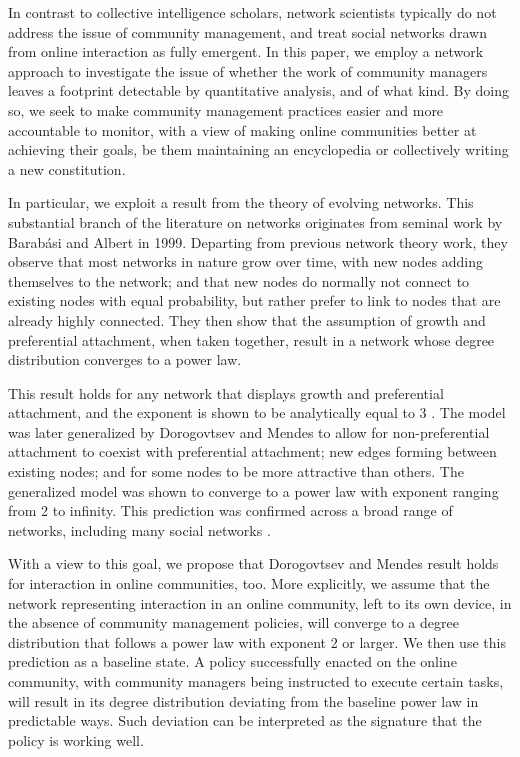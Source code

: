 \documentclass{nws}
\begin{document}
In contrast to collective intelligence scholars, network scientists typically do not address the issue of community management, and treat social networks drawn from online interaction as fully emergent. In this paper, we employ a network approach to investigate the issue of whether the work of community managers leaves a footprint detectable by quantitative analysis, and of what kind. By doing so, we seek to make community management practices easier and more accountable to monitor, with a view of making online communities better at achieving their goals, be them maintaining an encyclopedia or collectively writing a new constitution. 

In particular, we exploit a result from the theory of evolving networks. This substantial branch of the literature on networks originates from seminal work by Barab\'asi and Albert \cite{barabasi1999emergence} in 1999. Departing from previous network theory work, they observe that most networks in nature grow over time, with new nodes adding themselves to the network; and that new nodes do normally not connect to existing nodes with equal probability, but rather prefer to link to nodes that are already highly connected. They then show that the assumption of growth and preferential attachment, when taken together, result in a network whose degree distribution converges to a power law.

This result holds for any network that displays growth and preferential attachment, and the exponent is shown to be analytically equal to 3 \cite{barabasi2005origin, barabasi1999mean}.  The model was later generalized by Dorogovtsev and Mendes to allow for non-preferential attachment to coexist with preferential attachment; new edges forming between existing nodes; and for some nodes to be more attractive than others. The generalized model was shown to converge to a power law with exponent ranging from 2 to infinity. This prediction was confirmed across a broad range of networks, including many social networks \cite{dorogovtsev2002evolution}.

With a view to this goal, we propose that Dorogovtsev and Mendes result \cite{dorogovtsev2002evolution} holds for interaction in online communities, too. More explicitly, we assume that the network representing interaction in an online community, left to its own device, in the absence of community management policies, will converge to a degree distribution that follows a power law with exponent 2 or larger. We then use this prediction as a baseline state. A policy successfully enacted on the online community, with community managers being instructed to execute certain tasks, will result in its degree distribution deviating from the baseline power law in predictable ways. Such deviation can be interpreted as the signature that the policy is working well. 
\end{document}
